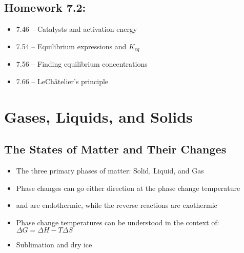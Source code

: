 \documentclass[12pt, openany, letterpaper]{memoir}
\begin{document}
\section*{Homework 7.2:}
\begin{itemize}
  \item 7.46 -- Catalysts and activation energy
  \item 7.54 -- Equilibrium expressions and $K_{eq}$
  \item 7.56 -- Finding equilibrium concentrations
  \item 7.66 -- LeCh\^atelier's principle
\end{itemize}

\chapter{Gases, Liquids, and Solids}
\section{The States of Matter and Their Changes}
\begin{itemize}
	\item The three primary phases of matter: Solid, Liquid, and Gas
	\item Phase changes can go either direction at the phase change temperature
	\item {} and  are endothermic, while the reverse reactions are exothermic
	\item Phase change temperatures can be understood in the context of: $\Delta G = \Delta H - T\Delta S$
	\item Sublimation and dry ice
\end{itemize}
\end{document}
